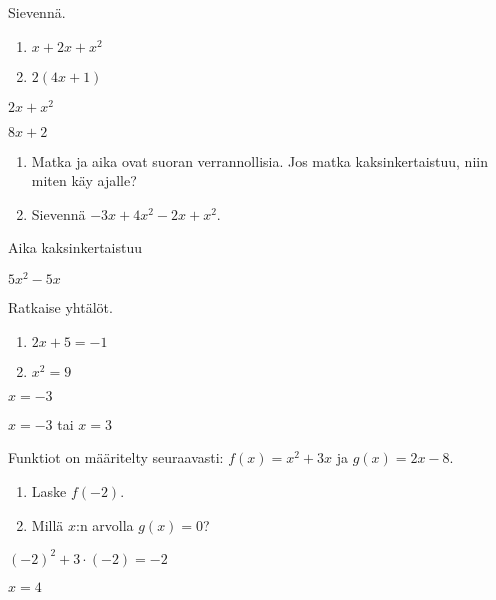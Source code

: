 \begin{tehtava}
Sievennä.
\begin{enumerate}
\item $x + 2x+x^2$
\item $2(4x+1)$
\end{enumerate}
\begin{vastaus}
\item $2x +x^2$
\item $8x+2$
\end{vastaus}
\end{tehtava}

\begin{tehtava}
\begin{enumerate}
\item Matka ja aika ovat suoran verrannollisia. Jos matka kaksinkertaistuu, niin miten käy ajalle?
\item Sievennä $-3x+4x^2-2x+x^2$.
\end{enumerate}
\begin{vastaus}
\item Aika kaksinkertaistuu
\item $5x^2-5x$
\end{vastaus}
\end{tehtava}

\begin{tehtava}
Ratkaise yhtälöt.
\begin{enumerate}
\item $2x+5 = -1$
\item $x^2 = 9$
\end{enumerate}
\begin{vastaus}
\item $x=-3$
\item $x=-3$ tai $x=3$
\end{vastaus}
\end{tehtava}

\begin{tehtava}
Funktiot on määritelty seuraavasti: $f(x)= x^2+3x$ ja $g(x)=2x-8$.
\begin{enumerate}
\item Laske $f(-2)$.
\item Millä $x$:n arvolla $g(x)=0$?
\end{enumerate}
\begin{vastaus}
\item $(-2)^2+3\cdot(-2)=-2$
\item $x=4$
\end{vastaus}
\end{tehtava}

